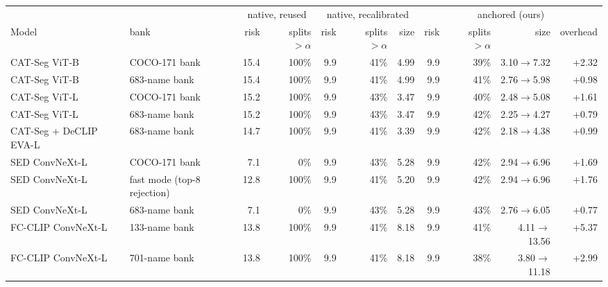 \begin{tabular}{@{}llrrrrrrrrr@{}}
\toprule
& & \multicolumn{2}{c}{native, reused} & \multicolumn{3}{c}{native, recalibrated} & \multicolumn{4}{c}{anchored (ours)} \\
\cmidrule(lr){3-4}\cmidrule(lr){5-7}\cmidrule(lr){8-11}
Model & bank & risk & splits $>\alpha$ & risk & splits $>\alpha$ & size & risk & splits $>\alpha$ & size & overhead \\
\midrule
CAT-Seg ViT-B & COCO-171 bank & 15.4 & 100\% & 9.9 & 41\% & 4.99 & 9.9 & 39\% & 3.10$\to$7.32 & +2.32 \\
CAT-Seg ViT-B & 683-name bank & 15.4 & 100\% & 9.9 & 41\% & 4.99 & 9.9 & 41\% & 2.76$\to$5.98 & +0.98 \\
CAT-Seg ViT-L & COCO-171 bank & 15.2 & 100\% & 9.9 & 43\% & 3.47 & 9.9 & 40\% & 2.48$\to$5.08 & +1.61 \\
CAT-Seg ViT-L & 683-name bank & 15.2 & 100\% & 9.9 & 43\% & 3.47 & 9.9 & 42\% & 2.25$\to$4.27 & +0.79 \\
CAT-Seg + DeCLIP EVA-L & 683-name bank & 14.7 & 100\% & 9.9 & 41\% & 3.39 & 9.9 & 42\% & 2.18$\to$4.38 & +0.99 \\
SED ConvNeXt-L & COCO-171 bank & 7.1 & 0\% & 9.9 & 43\% & 5.28 & 9.9 & 42\% & 2.94$\to$6.96 & +1.69 \\
SED ConvNeXt-L & fast mode (top-8 rejection) & 12.8 & 100\% & 9.9 & 41\% & 5.20 & 9.9 & 42\% & 2.94$\to$6.96 & +1.76 \\
SED ConvNeXt-L & 683-name bank & 7.1 & 0\% & 9.9 & 43\% & 5.28 & 9.9 & 43\% & 2.76$\to$6.05 & +0.77 \\
FC-CLIP ConvNeXt-L & 133-name bank & 13.8 & 100\% & 9.9 & 41\% & 8.18 & 9.9 & 41\% & 4.11$\to$13.56 & +5.37 \\
FC-CLIP ConvNeXt-L & 701-name bank & 13.8 & 100\% & 9.9 & 41\% & 8.18 & 9.9 & 38\% & 3.80$\to$11.18 & +2.99 \\
\bottomrule
\end{tabular}
